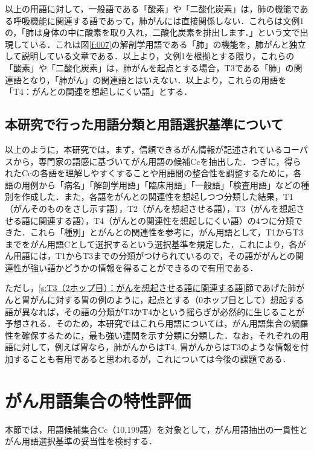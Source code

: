 \documentclass[japanese]{jnlp_1.4}
\begin{document}
以上の用語に対して，一般語である「酸素」や「二酸化炭素」は，肺の機能である呼吸機能に関連する語であって，肺がんには直接関係しない．これらは文例1の，「肺は身体の中に酸素を取り入れ，二酸化炭素を排出します．」という文で出現している．これは図\ref{f:007}の解剖学用語である「肺」の機能を，肺がんと独立して説明している文章である．以上より，文例1を根拠とする限り，これらの「酸素」や「二酸化炭素」は，肺がんを起点とする場合，T3である「肺」の関連語となり，「肺がん」の関連語とはいえない．以上より，これらの用語を「T4：がんとの関連を想起しにくい語」とする．

\subsection{本研究で行った用語分類と用語選択基準について}
\label{s:本研究で行った用語分類と用語選択基準について}

以上のように，本研究では，まず，信頼できるがん情報が記述されているコーパスから，専門家の語感に基づいてがん用語の候補Ccを抽出した．つぎに，得られたCcの各語を理解しやすくすることや用語間の整合性を調整するために，各語の用例から「病名」「解剖学用語」「臨床用語」「一般語」「検査用語」などの種別を作成した．また，各語をがんとの関連性を想起しつつ分類した結果，T1（がんそのものをさし示す語），T2（がんを想起させる語），T3（がんを想起させる語に関連する語），T4（がんとの関連性を想起しにくい語）の4つに分類できた．これら「種別」とがんとの関連性を参考に，がん用語として，T1からT3までをがん用語Cとして選択するという選択基準を規定した．これにより，各がん用語には，T1からT3までの分類がつけられているので，その語ががんとの関連性が強い語かどうかの情報を得ることができるので有用である．

ただし，\ref{s:T3（2ホップ目）：がんを想起させる語に関連する語}節であげた肺がんと胃がんに対する胃の例のように，起点とする（0ホップ目として）想起する語が異なれば，その語の分類がT3かT4かという揺らぎが必然的に生じることが予想される．そのため，本研究ではこれら用語については，がん用語集合の網羅性を確保するために，最も強い連関を示す分類に分類した．なお，それぞれの用語に対して，例えば胃なら，肺がんからはT4, 胃がんからはT3のような情報を付加することも有用であると思われるが，これについては今後の課題である．



\section{がん用語集合の特性評価}
\label{s:がん用語集合の特性評価}

本節では，用語候補集合Cc（10,199語）を対象として，がん用語抽出の一貫性とがん用語選択基準の妥当性を検討する．
\end{document}
